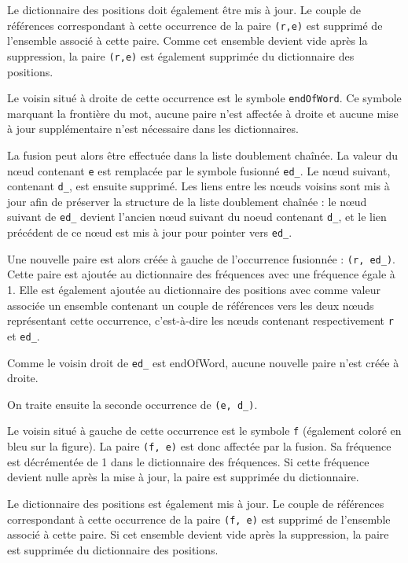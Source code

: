 \documentclass[12pt,a4paper]{report}
\begin{document}
	Le dictionnaire des positions doit également être mis à jour. Le couple de références correspondant à cette occurrence de la paire \texttt{(r,e)} est supprimé de l’ensemble associé à cette paire. Comme cet ensemble devient vide après la suppression, la paire \texttt{(r,e)} est également supprimée du dictionnaire des positions.
	
	Le voisin situé à droite de cette occurrence est le symbole \texttt{endOfWord}. Ce symbole marquant la frontière du mot, aucune paire n’est affectée à droite et aucune mise à jour supplémentaire n’est nécessaire dans les dictionnaires.
	
	La fusion peut alors être effectuée dans la liste doublement chaînée. La valeur du nœud contenant \texttt{e} est remplacée par le symbole fusionné \texttt{ed\_}. Le nœud suivant, contenant \texttt{d\_}, est ensuite supprimé. Les liens entre les nœuds voisins sont mis à jour afin de préserver la structure de la liste doublement chaînée : le nœud suivant de \texttt{ed\_} devient l’ancien nœud suivant du noeud contenant \texttt{d\_}, et le lien précédent de ce nœud est mis à jour pour pointer vers \texttt{ed\_}.

	Une nouvelle paire est alors créée à gauche de l’occurrence fusionnée : \texttt{(r, ed\_)}. Cette paire est ajoutée au dictionnaire des fréquences avec une fréquence égale à 1. Elle est également ajoutée au dictionnaire des positions avec comme valeur associée un ensemble contenant un couple de références vers les deux nœuds représentant cette occurrence, c’est-à-dire les nœuds contenant respectivement \texttt{r} et \texttt{ed\_}.
	
	Comme le voisin droit de \texttt{ed\_} est endOfWord, aucune nouvelle paire n’est créée à droite.
	
	On traite ensuite la seconde occurrence de \texttt{(e, d\_)}.
	
	Le voisin situé à gauche de cette occurrence est le symbole \texttt{f} (également coloré en bleu sur la figure). La paire \texttt{(f, e)} est donc affectée par la fusion. Sa fréquence est décrémentée de 1 dans le dictionnaire des fréquences. Si cette fréquence devient nulle après la mise à jour, la paire est supprimée du dictionnaire.
	
	Le dictionnaire des positions est également mis à jour. Le couple de références correspondant à cette occurrence de la paire \texttt{(f, e)} est supprimé de l’ensemble associé à cette paire. Si cet ensemble devient vide après la suppression, la paire est supprimée du dictionnaire des positions.
	
\end{document}

